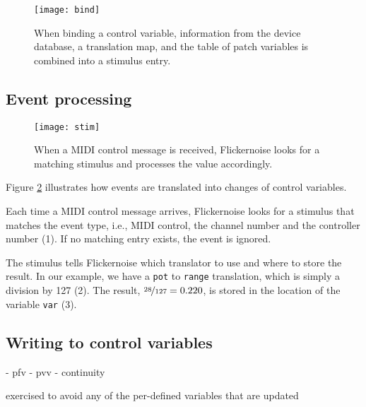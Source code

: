 \documentclass[11pt,a4paper]{article}
\begin{document}
\begin{figure}[!tb]
\begin{center}
\texttt{[image: bind]}
\end{center}
\caption{When binding a control variable, information from the device
  database, a translation map, and the table of patch variables is
  combined into a stimulus entry.}
\label{bind}
\end{figure}




\subsection{Event processing}

\begin{figure}[!tb]
\begin{center}
\texttt{[image: stim]}
\end{center}
\caption{When a MIDI control message is received, Flickernoise looks
  for a matching stimulus and processes the value accordingly.}
\label{stim}
\end{figure}

Figure \ref{stim} illustrates how events are translated into changes
of control variables.

Each time a MIDI control message arrives, Flickernoise looks for a
stimulus that matches the event type, i.e., MIDI control, the channel
number and the controller number (1). If no matching entry exists,
the event is ignored.

The stimulus tells Flickernoise which translator to use and where
to store the result. In our example, we have a {\tt pot} to {\tt range}
translation, which is simply a division by 127 (2). The result,
$\nicefrac{28}{127}=0.220$, is stored in the location of the variable
{\tt var} (3).




\subsection{Writing to control variables}

- pfv
- pvv
- continuity

exercised to avoid any of the per-defined variables that are updated

\end{document}
